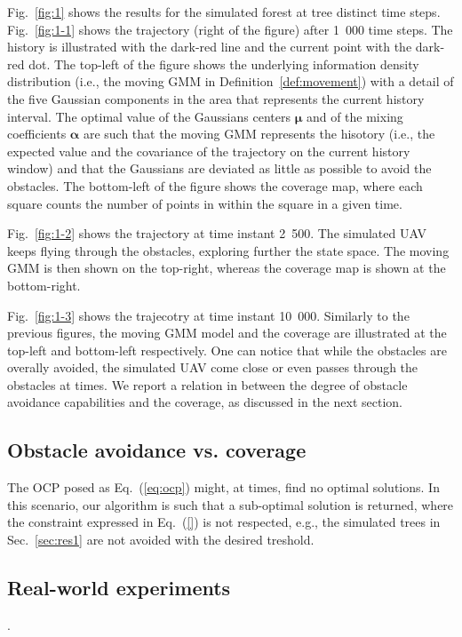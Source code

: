 \documentclass[letterpaper,10pt,conference,twoside]{IEEEtran}
\theoremstyle{definition}
\begin{document}
Fig.~\ref{fig:1} shows the results for the simulated forest at tree distinct time steps. Fig.~\ref{fig:1-1} shows the trajectory (right of the figure) after 1~000 time steps. The history is illustrated with the dark-red line and the current point with the dark-red dot. The top-left of the figure shows the underlying information density distribution (i.e., the moving GMM in Definition~\ref{def:movement}) with a detail of the five Gaussian components in the area that represents the current history interval. The optimal value of the Gaussians centers $\boldsymbol{\mu}$ and of the mixing coefficients $\boldsymbol{\alpha}$ are such that the moving GMM represents the hisotory (i.e., the expected value and the covariance of the trajectory on the current history window) and that the Gaussians are deviated as little as possible to avoid the obstacles.
The bottom-left of the figure shows the coverage map, where each square counts the number of points in within the square in a given time.

Fig.~\ref{fig:1-2} shows the trajectory at time instant 2~500. The simulated UAV keeps flying through the obstacles, exploring further the state space. The moving GMM is then shown on the top-right, whereas the coverage map is shown at the bottom-right.

Fig.~\ref{fig:1-3} shows the trajecotry at time instant 10~000. Similarly to the previous figures, the moving GMM model and the coverage are illustrated at the top-left and bottom-left respectively. One can notice that while the obstacles are overally avoided, the simulated UAV come close or even passes through the obstacles at times. We report a relation in between the degree of obstacle avoidance capabilities and the coverage, as discussed in the next section.

\subsection{Obstacle avoidance vs. coverage}\label{sec:res2}
\noindent
The OCP posed as Eq.~(\ref{eq:ocp}) might, at times, find no optimal solutions. In this scenario, our algorithm is such that a sub-optimal solution is returned, where the constraint expressed in Eq.~(\ref{}) is not respected, e.g., the simulated trees in Sec.~\ref{sec:res1} are not avoided with the desired treshold.

\subsection{Real-world experiments}\label{sec:res3}
\noindent
.
\end{document}
